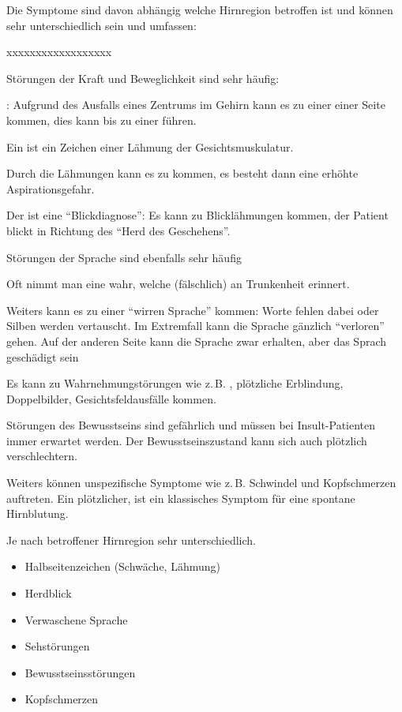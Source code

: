 {
Die Symptome sind davon abhängig welche Hirnregion betroffen ist und 
können sehr unterschiedlich sein und umfassen:

\begin{labeling}[~--]{xxxxxxxxxxxxxxxxxx}
  \item[Motorik] Störungen der Kraft und Beweglichkeit sind sehr häufig:
  
  : Aufgrund des Ausfalls eines Zentrums im
  Gehirn kann es zu einer  einer Seite kommen, dies kann bis
  zu einer  führen.
  
  Ein  ist ein Zeichen einer Lähmung
  der Gesichtsmuskulatur.
  
  Durch die Lähmungen kann es zu  kommen, es
  besteht dann eine erhöhte Aspirationsgefahr.
  
  Der  ist eine "`Blickdiagnose"': Es kann zu Blicklähmungen
  kommen, der Patient blickt in Richtung des "`Herd des Geschehens"'.
  
  \item[Sprache] Störungen der Sprache sind ebenfalls sehr
  häufig
  
  Oft nimmt man eine  wahr, welche (fälschlich) an
  Trunkenheit erinnert.
  
  Weiters kann es zu einer "`wirren Sprache"' kommen: Worte fehlen dabei oder
  Silben werden vertauscht. Im Extremfall kann die Sprache gänzlich "`verloren"'
  gehen. Auf der anderen Seite kann die Sprache zwar erhalten, aber das
  Sprach geschädigt sein
  
  \item[Wahrnehmung]
  Es kann zu Wahrnehmungstörungen wie z.\,B. , plötzliche
  Erblindung, Doppelbilder, Gesichtsfeldausfälle kommen.
  
  \item[Bewusstsein] Störungen des Bewusstseins sind gefährlich und müssen bei
  Insult-Patienten immer erwartet werden. Der Bewusstseinszustand kann sich
  auch plötzlich verschlechtern.
  
  \item[Allgemein] Weiters können unspezifische Symptome wie z.\,B.
  Schwindel und Kopfschmerzen auftreten.
  Ein plötzlicher,  ist ein klassisches
  Symptom für eine spontane Hirnblutung.
  
\end{labeling}
}
{
Je nach betroffener Hirnregion sehr unterschiedlich.
\begin{itemize}
  \item Halbseitenzeichen (Schwäche, Lähmung)
  \item Herdblick
  \item Verwaschene Sprache
  \item Sehstörungen
  \item Bewusstseinsstörungen
  \item Kopfschmerzen
\end{itemize}
}{}{}{}


